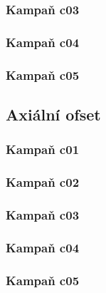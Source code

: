 \documentclass[a4paper,twoside,11pt]{article}
\begin{document}


\subsubsection{Kampaň c03}



\subsubsection{Kampaň c04}



\subsubsection{Kampaň c05}




\subsection{Axiální ofset}


\subsubsection{Kampaň c01}



\subsubsection{Kampaň c02}



\subsubsection{Kampaň c03}



\subsubsection{Kampaň c04}



\subsubsection{Kampaň c05}


\end{document}
